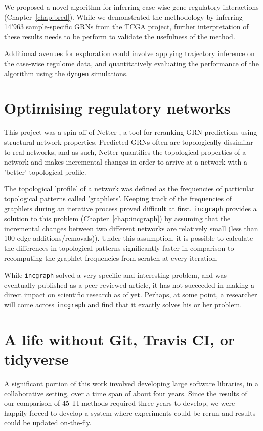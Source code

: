 We proposed a novel algorithm for inferring case-wise gene regulatory interactions (Chapter~\ref{chap:bred}). While we demonstrated the methodology by inferring 14'963 sample-specific GRNs from the TCGA project, further interpretation of these results needs to be perform to validate the usefulness of the method.

Additional avenues for exploration could involve applying trajectory inference on the case-wise regulome data, and quantitatively evaluating the performance of the algorithm using the \texttt{dyngen} simulations.

\section{Optimising regulatory networks}
This project was a spin-off of Netter \cite{ruyssinck_netterrerankinggene_2016}, a tool for reranking GRN predictions using structural network properties. 
Predicted GRNs often are topologically dissimilar to real networks, and as such, Netter quantifies the topological properties of a network and makes incremental changes in order to arrive at a network with a 'better' topological profile.

The topological 'profile' of a network was defined as the frequencies of particular topological patterns called 'graphlets'. Keeping track of the frequencies of graphlets during an iterative process proved difficult at first. 
\texttt{incgraph} provides a solution to this problem (Chapter~\ref{chap:incgraph}) by  assuming that the incremental changes between two different networks are relatively small (less than 100 edge additions/removals)). Under this assumption, it is possible to calculate the differences in topological patterns significantly faster in comparison to recomputing the graphlet frequencies from scratch at every iteration.

While \texttt{incgraph} solved a very specific and interesting problem, and was eventually published as a peer-reviewed article, it has not succeeded in making a direct impact on scientific research as of yet. Perhaps, at some point, a researcher will come across \texttt{incgraph} and find that it exactly solves his or her problem.



\section{A life without Git, Travis CI, or tidyverse}
A significant portion of this work involved developing large software libraries, in a collaborative setting, over a time span of about four years. Since the results of our comparison of 45 TI methods required three years to develop, we were happily forced to develop a system where experiments could be rerun and results could be updated on-the-fly.

